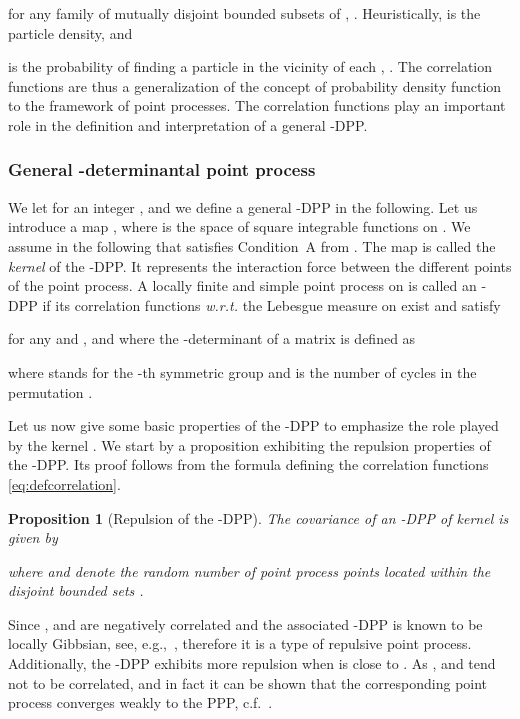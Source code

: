 \documentclass[12pt,draftclsnofoot,onecolumn]{IEEEtran}
\newtheorem{prop}{Proposition}
\begin{document}
for any family of mutually disjoint bounded subsets  of , . 
Heuristically,  is the particle density, and 

is the probability of finding a particle in the vicinity of each , . The correlation functions are thus a generalization of the concept of probability density function to the framework of point processes. The correlation functions play an important role in the definition and interpretation of a general -DPP.

\subsubsection{General -determinantal point process}

We let  for an integer , and we define a general -DPP in the following. Let us introduce a map , where  is the space of square integrable functions on . We assume in the following that  satisfies Condition~A from \cite{ShiraiTakahashi}.
The map  is called the {\em kernel} of the -DPP. It represents the interaction force between the different points of the point process. 
A locally
finite and simple point process on  is called an -DPP if its
correlation functions {\em w.r.t.} the Lebesgue measure on  exist and
satisfy

for any  and , and where the -determinant of a matrix  is defined as

where  stands for the -th symmetric group and  is the number of cycles in the permutation . 

Let us now give some basic properties of the -DPP to emphasize the role played by the kernel . We start by a proposition exhibiting the repulsion properties of the -DPP. Its proof follows from the formula defining the correlation functions \eqref{eq:defcorrelation}.
\begin{prop}[Repulsion of the -DPP]
 The covariance of an 
 -DPP of kernel  is given by 

 where 
  and  
 denote the random number of point process 
 points located within the disjoint bounded sets 
 . 
\end{prop}

Since ,  and  are negatively correlated and the associated -DPP is known to be locally Gibbsian, see, e.g.,~\cite{GeorgiiYoo}, therefore it is a type of repulsive point process. Additionally, the -DPP exhibits more repulsion when  is close to . As ,  and  tend not to be correlated, and in fact it can be shown that the corresponding point process converges weakly to the PPP, c.f.~\cite{ShiraiTakahashi}.
\end{document}
